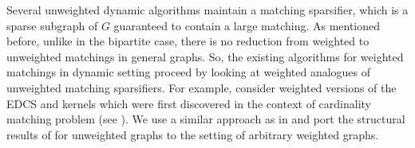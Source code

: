 \documentclass[a4paper,11pt]{article}
\newcommand{\card}[1]{|#1|}
\newcommand{\eps}{\varepsilon}
\theoremstyle{definition}
\theoremstyle{definition}
\theoremstyle{definition}
\theoremstyle{definition}
\theoremstyle{definition}
\newtheorem{lemma2}[definition2]{Lemma}
\theoremstyle{definition}
\theoremstyle{definition}
\theoremstyle{definition}
\theoremstyle{definition}
\theoremstyle{definition}
\theoremstyle{definition}
\theoremstyle{definition}
\theoremstyle{definition}
\theoremstyle{definition}
\theoremstyle{definition}
\begin{document}
Several unweighted dynamic algorithms maintain a matching sparsifier, which is a sparse subgraph of $G$ guaranteed to contain a large matching. As mentioned before, unlike in the bipartite case, there is no reduction from weighted to unweighted matchings in general graphs. So, the existing algorithms for weighted matchings in dynamic setting proceed by looking at weighted analogues of unweighted matching sparsifiers. For example, \cite{BernsteinDL21} consider weighted versions of the EDCS and kernels which were first discovered in the context of cardinality matching problem (see \cite{BS15,BS16,BHI15}). We use a similar approach as in \cite{BernsteinDL21} and port the structural results of \cite{AssadiBD22} for unweighted graphs to the setting of arbitrary weighted graphs. 




\end{document}
